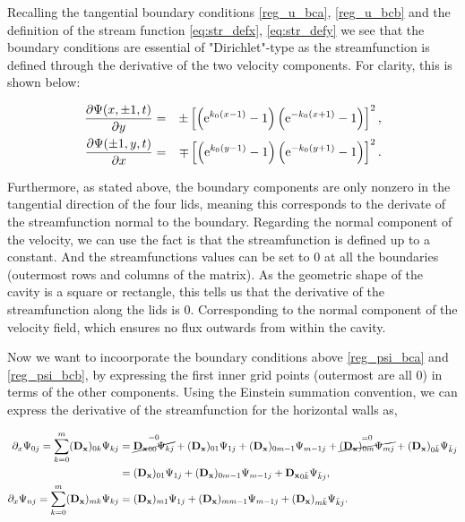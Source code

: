 Recalling the tangential boundary conditions \eqref{reg_u_bca},
\eqref{reg_u_bcb} and the definition of the stream function
\eqref{eq:str_defx}, \eqref{eq:str_defy} we see that the boundary conditions
are essential of "Dirichlet"-type as the streamfunction is defined through the
derivative of the two velocity components. For clarity, this is shown below:

\begin{eqnarray}
\frac{\partial\Psi(x,\pm 1,t)}{\partial y} & = & \pm\left[\left(\mathrm{e}^{k_0(x - 1)} - 1\right)
  \left(\mathrm{e}^{-k_0(x + 1)} - 1\right)\right]^2,\label{reg_psi_bca} \\
  \frac{\partial\Psi(\pm 1,y,t)}{\partial x} & = & \mp\left[\left(\mathrm{e}^{k_0(y - 1)} - 1\right)
  \left(\mathrm{e}^{-k_0(y + 1)} - 1\right)\right]^2.\label{reg_psi_bcb}
\end{eqnarray}

Furthermore, as stated above, the boundary components are only nonzero in the
tangential direction of the four lids, meaning this corresponds to the derivate
of the streamfunction normal to the boundary. Regarding the normal component of
the velocity, we can use the fact is that the streamfunction is defined up to a
constant. And the streamfunctions values can be set to $0$ at all the
boundaries (outermost rows and columns of the matrix). As the geometric shape
of the cavity is a square or rectangle, this tells us that the derivative of
the streamfunction along the lids is $0$. Corresponding to the normal component
of the velocity field, which ensures no flux outwards from within the cavity.

Now we want to incoorporate the boundary conditions above \eqref{reg_psi_bca}
and \eqref{reg_psi_bcb}, by expressing the first inner grid points (outermost
are all $0$) in terms of the other components. Using the Einstein summation
convention, we can express the derivative of the streamfunction for the horizontal walls as,

\begin{align}
\partial_x \Psi_{0j} = \sum_{k=0}^{m} (\mathbf{D_x})_{0k} \Psi_{kj}
  &= \overset{=0}{\cancel{\mathbf{D_x}_{00}\Psi_{kj}}} + (\mathbf{D_x})_{01}\Psi_{1j} 
  + (\mathbf{D_x})_{0m-1}\Psi_{m-1j} +  \overset{=0}{\cancel{(\mathbf{D_x})_{0m}\Psi_{mj}}}
  + (\mathbf{D_x})_{0\bar{k}}\Psi_{\bar{k}j} \nonumber \\
  &= (\mathbf{D_x})_{01}\Psi_{1j} + (\mathbf{D_x})_{0m-1}\Psi_{m-1j}
  + \mathbf{D_x}_{0\bar{k}}\Psi_{\bar{k}j}, \\
\partial_x \Psi_{nj} = \sum_{k=0}^{m} (\mathbf{D_x})_{mk} \Psi_{kj}
  &= (\mathbf{D_x})_{m1}\Psi_{1j} + (\mathbf{D_x})_{mm-1}\Psi_{m-1j} 
  + (\mathbf{D_x})_{m\bar{k}}\Psi_{\bar{k}j}.
\end{align}

